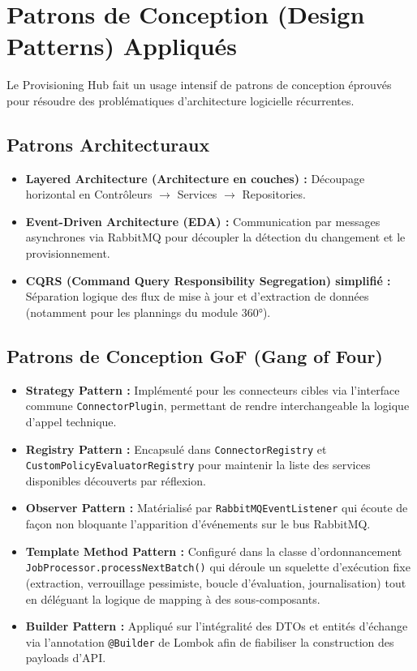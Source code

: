 \section{Patrons de Conception (Design Patterns) Appliqués}
Le Provisioning Hub fait un usage intensif de patrons de conception éprouvés pour résoudre des problématiques d'architecture logicielle récurrentes.

\subsection{Patrons Architecturaux}
\begin{itemize}
    \item \textbf{Layered Architecture (Architecture en couches) :} Découpage horizontal en Contrôleurs $\rightarrow$ Services $\rightarrow$ Repositories.
    \item \textbf{Event-Driven Architecture (EDA) :} Communication par messages asynchrones via RabbitMQ pour découpler la détection du changement et le provisionnement.
    \item \textbf{CQRS (Command Query Responsibility Segregation) simplifié :} Séparation logique des flux de mise à jour et d'extraction de données (notamment pour les plannings du module 360°).
\end{itemize}

\subsection{Patrons de Conception GoF (Gang of Four)}
\begin{itemize}
    \item \textbf{Strategy Pattern :} Implémenté pour les connecteurs cibles via l'interface commune \texttt{ConnectorPlugin}, permettant de rendre interchangeable la logique d'appel technique.
    \item \textbf{Registry Pattern :} Encapsulé dans \texttt{ConnectorRegistry} et \texttt{CustomPolicyEvaluatorRegistry} pour maintenir la liste des services disponibles découverts par réflexion.
    \item \textbf{Observer Pattern :} Matérialisé par \texttt{RabbitMQEventListener} qui écoute de façon non bloquante l'apparition d'événements sur le bus RabbitMQ.
    \item \textbf{Template Method Pattern :} Configuré dans la classe d'ordonnancement \texttt{JobProcessor.processNextBatch()} qui déroule un squelette d'exécution fixe (extraction, verrouillage pessimiste, boucle d'évaluation, journalisation) tout en déléguant la logique de mapping à des sous-composants.
    \item \textbf{Builder Pattern :} Appliqué sur l'intégralité des DTOs et entités d'échange via l'annotation \texttt{@Builder} de Lombok afin de fiabiliser la construction des payloads d'API.
\end{itemize}

